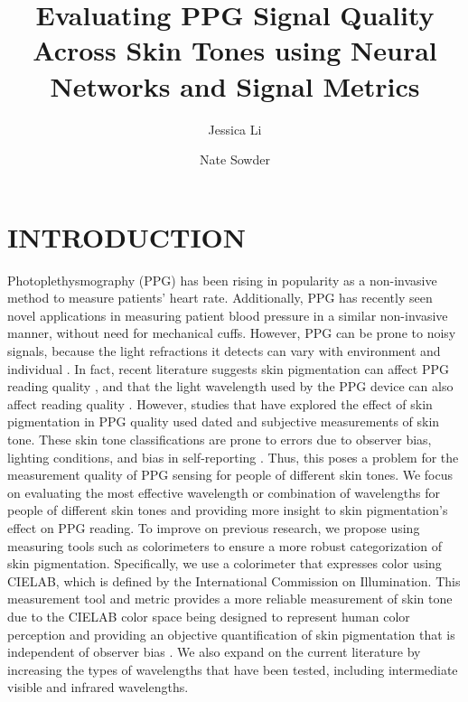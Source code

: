 \documentclass[letterpaper, 10 pt, conference]{ieeeconf}  %
\title{\LARGE \bf
Evaluating PPG Signal Quality Across Skin Tones using Neural Networks and Signal Metrics
}
\author[1]{Jessica Li}
\author[1]{Nate Sowder}
\affil[1]{Department of Computer Science, Northwestern University, Evanston, IL}
\begin{document}
\maketitle
\thispagestyle{empty}
\pagestyle{empty}


\begin{abstract}



\end{abstract}


\section{INTRODUCTION}

Photoplethysmography (PPG) has been rising in popularity as a non-invasive method to measure patients’ heart rate. Additionally, PPG has recently seen novel applications in measuring patient blood pressure \cite{elgendi_photoplethysmography_2024} in a similar non-invasive manner, without need for mechanical cuffs. However, PPG can be prone to noisy signals, because the light refractions it detects can vary with environment and individual \cite{castaneda_review_2018}. In fact, recent literature suggests skin pigmentation can affect PPG reading quality \cite{al-halawani_review_2023}, and that the light wavelength used by the PPG device can also affect reading quality \cite{fallow_influence_2013}. However, studies that have explored the effect of skin pigmentation in PPG quality used dated and subjective measurements of skin tone. These skin tone classifications are prone to errors due to observer bias, lighting conditions, and bias in self-reporting \cite{vasudevan_melanometry_2024}. Thus, this poses a problem for the measurement quality of PPG sensing for people of different skin tones. We focus on evaluating the most effective wavelength or combination of wavelengths for people of different skin tones and providing more insight to skin pigmentation’s effect on PPG reading. To improve on previous research, we propose using measuring tools such as colorimeters to ensure a more robust categorization of skin pigmentation. Specifically, we use a colorimeter that expresses color using CIELAB, which is defined by the International Commission on Illumination. This measurement tool and metric provides a more reliable measurement of skin tone due to the CIELAB color space being designed to represent human color perception and providing an objective quantification of skin pigmentation that is independent of observer bias \cite{ly_research_2020}. We also expand on the current literature by increasing the types of wavelengths that have been tested, including intermediate visible and infrared wavelengths. 
\end{document}
